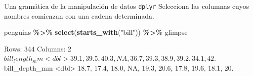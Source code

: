 \documentclass[
  ignorenonframetext,
  aspectratio=169]{beamer}
\newenvironment{Shaded}{\begin{snugshade}}{\end{snugshade}}
\newcommand{\FunctionTok}[1]{\textcolor[rgb]{0.13,0.29,0.53}{\textbf{#1}}}
\newcommand{\NormalTok}[1]{#1}
\newcommand{\SpecialCharTok}[1]{\textcolor[rgb]{0.81,0.36,0.00}{\textbf{#1}}}
\newcommand{\StringTok}[1]{\textcolor[rgb]{0.31,0.60,0.02}{#1}}
\let\oldverbatim\verbatim
\let\endoldverbatim\endverbatim
\renewenvironment{verbatim}{\tiny\oldverbatim}{\endoldverbatim}
\begin{document}

\begin{frame}[fragile]{Una gramática de la manipulación de datos
\texttt{dplyr}}
\label{una-gramuxe1tica-de-la-manipulaciuxf3n-de-datos-dplyr-10}
Selecciona las columnas cuyos nombres comienzan con una cadena
determinada.

\begin{Shaded}
\begin{Highlighting}[]
\NormalTok{penguins }\SpecialCharTok{\%\textgreater{}\%} 
  \FunctionTok{select}\NormalTok{(}\FunctionTok{starts\_with}\NormalTok{(}\StringTok{"bill"}\NormalTok{)) }\SpecialCharTok{\%\textgreater{}\%} 
\NormalTok{  glimpse}
\end{Highlighting}
\end{Shaded}

\begin{verbatim}
Rows: 344
Columns: 2
$ bill_length_mm <dbl> 39.1, 39.5, 40.3, NA, 36.7, 39.3, 38.9, 39.2, 34.1, 42.~
$ bill_depth_mm  <dbl> 18.7, 17.4, 18.0, NA, 19.3, 20.6, 17.8, 19.6, 18.1, 20.~
\end{verbatim}
\end{frame}
\end{document}
